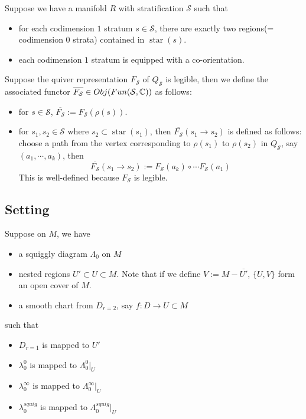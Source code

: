 \begin{definition}
Suppose we have a manifold $R$ with stratification $\mathcal{S}$ such that
\begin{itemize}
\item for each codimension $1$ stratum $s\in \mathcal{S}$, there are exactly two regions(= codimension $0$ strata) contained in $\operatorname{star}(s)$.

\item each codimension $1$ stratum is equipped with a co-orientation.
\end{itemize}
Suppose the quiver representation $F_\mathcal{S}$ of $Q_\mathcal{S}$ is legible, then we define the associated functor $\overline{F_\mathcal{S}}\in Obj(Fun(\mathcal{S}, \mathbb{C}))$ as follows:
\begin{itemize}
\item for $s\in \mathcal{S}$, $\overline{F_\mathcal{S}} := F_\mathcal{S}(\rho(s))$.

\item for $s_1,s_2 \in \mathcal{S}$ where $s_2 \subset \operatorname{star}(s_1)$, then $\overline{F_\mathcal{S}}(s_1 \rightarrow s_2)$ is defined as follows: choose a path from the vertex corresponding to $\rho(s_1)$ to $\rho(s_2)$ in $Q_\mathcal{S}$, say $(a_1,\cdots,a_k)$, then 
\[
\overline{F_\mathcal{S}}(s_1 \rightarrow s_2) := F_\mathcal{S}(a_k)\circ\cdots F_\mathcal{S}(a_1)
\] 
This is well-defined because $F_\mathcal{S}$ is legible.
\end{itemize}
\end{definition}

\subsection*{Setting}
Suppose on $M$, we have
\begin{itemize}
\item  a squiggly diagram $\Lambda_0$ on $M$

\item nested regions $U' \subset U \subset M$. Note that if we define $V:= M - \overline{U'}$, $\{U,V\}$ form an open cover of $M$.

\item a smooth chart from $D_{r=2}$, say $f: D  \rightarrow U \subset M$
\end{itemize}
such that 
\begin{itemize}
\item $D_{r=1}$ is mapped to $U'$ 

\item $\lambda_0^0$ is mapped to $\Lambda_0^0 |_{U}$

\item $\lambda_0^\infty$ is mapped to $\Lambda_0^\infty |_{U}$

\item $\lambda_0^{squig}$ is mapped to $\Lambda_0^{squig} |_{U}$
\end{itemize}

